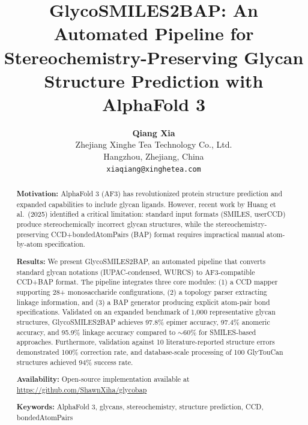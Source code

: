 \documentclass[11pt,a4paper]{article}
\title{\textbf{GlycoSMILES2BAP: An Automated Pipeline for Stereochemistry-Preserving Glycan Structure Prediction with AlphaFold 3}}
\author{
 \textbf{Qiang Xia}\\
 Zhejiang Xinghe Tea Technology Co., Ltd.\\
 Hangzhou, Zhejiang, China\\
 \texttt{xiaqiang@xinghetea.com}
}
\date{}
\begin{document}
\maketitle

\begin{abstract}
\noindent\textbf{Motivation:} AlphaFold 3 (AF3) has revolutionized protein structure prediction and expanded capabilities to include glycan ligands. However, recent work by Huang et al.\ (2025) identified a critical limitation: standard input formats (SMILES, userCCD) produce stereochemically incorrect glycan structures, while the stereochemistry-preserving CCD+bondedAtomPairs (BAP) format requires impractical manual atom-by-atom specification.

\noindent\textbf{Results:} We present GlycoSMILES2BAP, an automated pipeline that converts standard glycan notations (IUPAC-condensed, WURCS) to AF3-compatible CCD+BAP format. The pipeline integrates three core modules: (1) a CCD mapper supporting 28+ monosaccharide configurations, (2) a topology parser extracting linkage information, and (3) a BAP generator producing explicit atom-pair bond specifications. Validated on an expanded benchmark of 1,000 representative glycan structures, GlycoSMILES2BAP achieves 97.8\% epimer accuracy, 97.4\% anomeric accuracy, and 95.9\% linkage accuracy compared to ${\sim}60\%$ for SMILES-based approaches. Furthermore, validation against 10 literature-reported structure errors demonstrated 100\% correction rate, and database-scale processing of 100 GlyTouCan structures achieved 94\% success rate.

\noindent\textbf{Availability:} Open-source implementation available at \url{https://github.com/ShawnXiha/glycobap}

\noindent\textbf{Keywords:} AlphaFold 3, glycans, stereochemistry, structure prediction, CCD, bondedAtomPairs
\end{abstract}

\linenumbers








\end{document}
